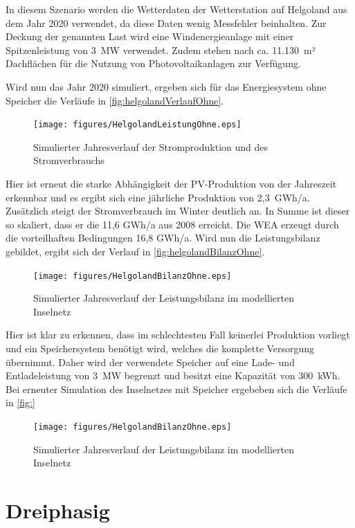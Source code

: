 In diesem Szenario werden die Wetterdaten der Wetterstation auf Helgoland aus dem Jahr 2020 verwendet, da diese Daten wenig Messfehler beinhalten. Zur Deckung der genannten Last wird eine Windenergieanlage mit einer Spitzenleistung von 3~MW verwendet. Zudem stehen nach \cite{Helgoland} ca. 11.130~m² Dachflächen für die Nutzung von Photovoltaikanlagen zur Verfügung. 

Wird nun das Jahr 2020 simuliert, ergeben sich für das Energiesystem ohne Speicher die Verläufe in \autoref{fig:helgolandVerlaufOhne}.

\begin{figure}[H]
	\centering
	\texttt{[image: figures/HelgolandLeistungOhne.eps]}
	\caption{Simulierter Jahresverlauf der Stromproduktion und des Stromverbrauchs}
	\label{fig:helgolandVerlaufOhne}
\end{figure}

Hier ist erneut die starke Abhängigkeit der PV-Produktion von der Jahreszeit erkennbar und es ergibt sich eine jährliche Produktion von 2,3~GWh/a. Zusätzlich steigt der Stromverbrauch im Winter deutlich an. In Summe ist dieser so skaliert, dass er die 11,6 GWh/a aus 2008 erreicht. Die WEA erzeugt durch die vorteilhaften Bedingungen 16,8 GWh/a. Wird nun die Leistungsbilanz gebildet, ergibt sich der Verlauf in \autoref{fig:helgolandBilanzOhne}.

\begin{figure}[H]
	\centering
	\texttt{[image: figures/HelgolandBilanzOhne.eps]}
	\caption{Simulierter Jahresverlauf der Leistungsbilanz im modellierten Inselnetz}
	\label{fig:helgolandBilanzOhne}
\end{figure}

Hier ist klar zu erkennen, dass im schlechtesten Fall keinerlei Produktion vorliegt und ein Speichersystem benötigt wird, welches die komplette Versorgung übernimmt. Daher wird der verwendete Speicher auf eine Lade- und Entladeleistung von 3~MW begrenzt und besitzt eine Kapazität von 300~kWh. Bei erneuter Simulation des Inselnetzes mit Speicher ergebeben sich die Verläufe in \autoref{fig:}

\begin{figure}[H]
	\centering
	\texttt{[image: figures/HelgolandBilanzOhne.eps]}
	\caption{Simulierter Jahresverlauf der Leistungsbilanz im modellierten Inselnetz}
	\label{fig:helgolandBilanzOhne}
\end{figure}

\section{Dreiphasig}
